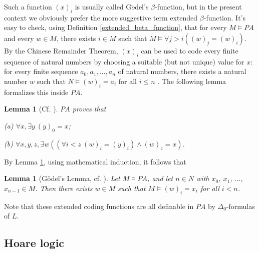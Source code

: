 \documentclass[a4paper,11pt]{article}
\begin{document}
Such a function $(x)_i$ is usually called G$\ddot{o}$del's $\beta$-function, but in the present context we obviously prefer the more suggestive term extended $\beta$-function. It's easy to check, using Definition \ref{extended_beta_function}, that for every $M\models PA$ and every $w\in M$, there exists $i\in M$ such that $M\models \forall j> i ( (w)_j = (w)_i )$. By the Chinese Remainder Theorem, $(x)_i$ can be used to code every finite sequence of natural numbers by choosing a suitable (but not unique) value for $x$: for every finite sequence $a_0,a_1,\ldots,a_n$ of natural numbers, there exists a natural number $w$ such that $N\models (w)_i = a_i$ for all $i\leq n$ \cite[Theorem 2.4]{computability_1}. The following lemma formalizes this inside $PA$.

\theoremstyle{plain}
\newtheorem{basic_properties_of_extended_beta_function}[basic_functions]{Lemma}
\begin{basic_properties_of_extended_beta_function}[{Cf. \cite[p63]{model_1}}]\label{basic_properties_of_extended_beta_function}
$PA$ proves that

(a) $\forall x, \exists y\ (y)_0=x$;

(b) $\forall x,y,z, \exists w ( (\forall i<z\ (w)_i=(y)_i) \wedge (w)_z=x)$.
\end{basic_properties_of_extended_beta_function}

By Lemma \ref{basic_properties_of_extended_beta_function}, using mathematical induction, it follows that

\newtheorem{godel_lemma}[basic_functions]{Lemma}
\begin{godel_lemma}[G\"{o}del's Lemma, cf. {\cite[Lemma 5.9]{model_1}}]\label{godel_lemma}
Let $M\models PA$, and let $n\in N$ with $x_0$, $x_1$, $\ldots$, $x_{n-1}\in M$. Then there exists $w\in M$ such that $M \models (w)_i = x_i$ for all $i< n$.
\end{godel_lemma}

Note that these extended coding functions are all definable in $PA$ by $\Delta_0$-formulas of $L$.

\subsection{Hoare logic}
\end{document}
